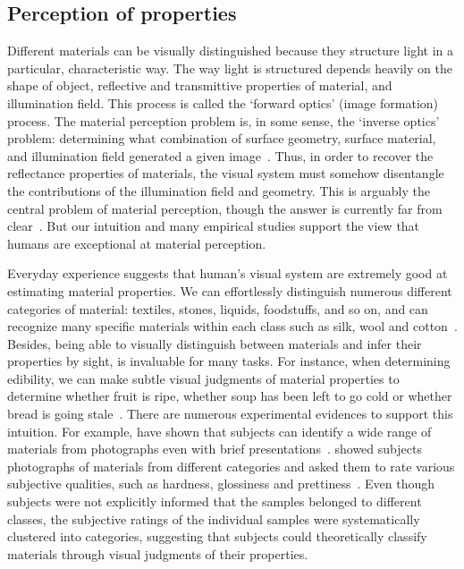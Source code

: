 \subsection{Perception of properties}
\label{sec:prop_percept}
Different materials can be visually distinguished because they structure light in a particular, characteristic way. The way light is structured depends heavily on the shape of object, reflective and transmittive properties of material, and illumination field. This process is called the `forward optics' (image formation) process. The material perception problem is, in some sense, the `inverse optics' problem: determining what combination of surface geometry, surface material, and illumination field generated a given image~\cite{anderson2011visual}. Thus, in order to recover the reflectance properties of materials, the visual system must somehow disentangle the contributions of the illumination field and geometry. This is arguably the central problem of material perception, though the answer is currently far from clear~\cite{anderson2011visual}. But our intuition and many empirical studies support the view that humans are exceptional at material perception.

Everyday experience suggests that human's visual system are extremely good at estimating material properties. We can effortlessly distinguish numerous different categories of material: textiles, stones, liquids, foodstuffs, and so on, and can recognize many specific materials within each class such as silk, wool and cotton~\cite{fleming2014visual}. Besides, being able to visually distinguish between materials and infer their properties by sight, is invaluable for many tasks. For instance, when determining edibility, we can make subtle visual judgments of material properties to determine whether fruit is ripe, whether soup has been left to go cold or whether bread is going stale~\cite{fleming2014visual}. There are numerous experimental evidences to support this intuition. For example, \citeauthor{sharan2009material} have shown that subjects can identify a wide range of materials from photographs even with brief presentations~\cite{sharan2009material}. \citeauthor{fleming2013perceptual} showed subjects photographs of materials from different categories and asked them to rate various subjective qualities, such as hardness, glossiness and prettiness~\cite{fleming2013perceptual}. Even though subjects were not explicitly informed that the samples belonged to different classes, the subjective ratings of the individual samples were systematically clustered into categories, suggesting that subjects could theoretically classify materials through visual judgments of their properties.

